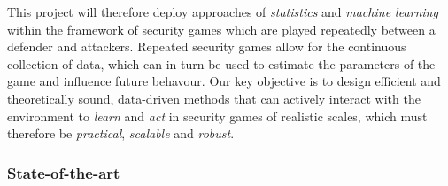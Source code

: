 
This project will therefore deploy approaches of {\em statistics} and {\em machine learning} within the framework of security games which are played repeatedly between a defender and attackers. Repeated security games allow for the continuous collection of data, which can in turn be used to estimate the parameters of the game and influence future behavour. %
Our key objective is to design efficient and theoretically sound, data-driven methods that can actively interact with the environment to {\em learn} and {\em act} in security games of realistic scales, which must therefore be \textit{practical}, \textit{scalable} and \textit{robust}. 

 

 

\subsubsection*{State-of-the-art}
